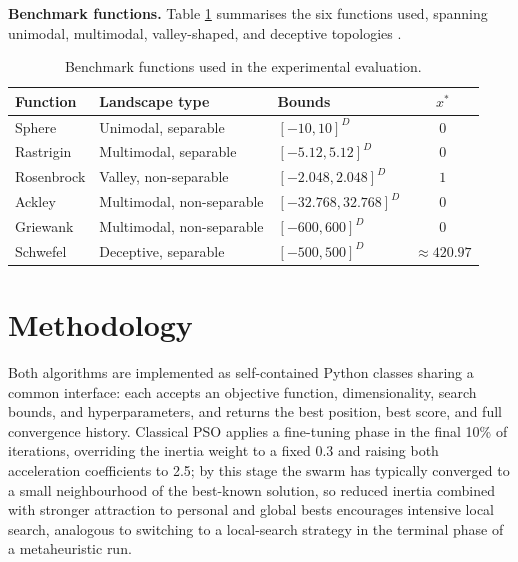 \documentclass[11pt]{article}
\begin{document}
\textbf{Benchmark functions.} Table \ref{tab:benchmarks} summarises the six functions used, spanning unimodal, multimodal, valley-shaped, and deceptive topologies \cite{rastrigin1974,rosenbrock1960,ackley1987,griewank1981,schwefel1981}.

\begin{table}[h]
\centering
\small
\vspace{-0.3em}
\begin{tabular}{lllc}
\toprule
Function & Landscape type & Bounds & $x^*$ \\
\midrule
Sphere & Unimodal, separable & $[-10,10]^D$ & $0$ \\
Rastrigin & Multimodal, separable & $[-5.12,5.12]^D$ & $0$ \\
Rosenbrock & Valley, non-separable & $[-2.048,2.048]^D$ & $1$ \\
Ackley & Multimodal, non-separable & $[-32.768,32.768]^D$ & $0$ \\
Griewank & Multimodal, non-separable & $[-600,600]^D$ & $0$ \\
Schwefel & Deceptive, separable & $[-500,500]^D$ & $\approx 420.97$ \\
\bottomrule
\end{tabular}
\caption{Benchmark functions used in the experimental evaluation.}
\label{tab:benchmarks}
\vspace{-0.5em}
\end{table}

\vspace{-0.3em}
\section{Methodology}
Both algorithms are implemented as self-contained Python classes sharing a common interface: each accepts an objective function, dimensionality, search bounds, and hyperparameters, and returns the best position, best score, and full convergence history. Classical PSO applies a fine-tuning phase in the final 10\% of iterations, overriding the inertia weight to a fixed 0.3 and raising both acceleration coefficients to 2.5; by this stage the swarm has typically converged to a small neighbourhood of the best-known solution, so reduced inertia combined with stronger attraction to personal and global bests encourages intensive local search, analogous to switching to a local-search strategy in the terminal phase of a metaheuristic run.
\end{document}
